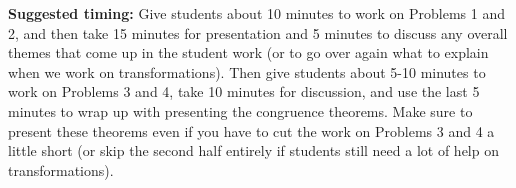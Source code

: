 \documentclass{ximera}
\begin{document}
\begin{instructorNotes}
{\bf Suggested timing:} Give students about 10 minutes to work on Problems 1 and 2, and then take 15 minutes for presentation and 5 minutes to discuss any overall themes that come up in the student work (or to go over again what to explain when we work on transformations). Then give students about 5-10 minutes to work on Problems 3 and 4, take 10 minutes for discussion, and use the last 5 minutes to wrap up with presenting the congruence theorems. Make sure to present these theorems even if you have to cut the work on Problems 3 and 4 a little short (or skip the second half entirely if students still need a lot of help on transformations).


\end{instructorNotes}
\end{document}

